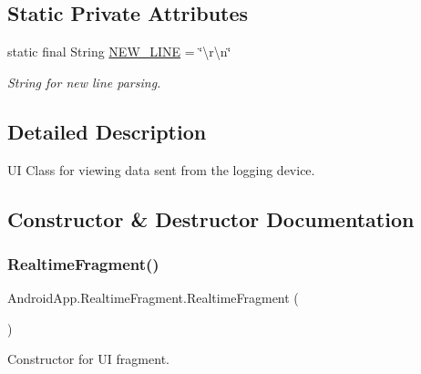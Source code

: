 \subsection*{Static Private Attributes}
\begin{DoxyCompactItemize}
\item 
\mbox{\label{class_android_app_1_1_realtime_fragment_a353558a83a489be25f413e3ea2451728}} 
static final String \hyperlink{class_android_app_1_1_realtime_fragment_a353558a83a489be25f413e3ea2451728}{N\+E\+W\+\_\+\+L\+I\+NE} = \char`\"{}\textbackslash{}r\textbackslash{}n\char`\"{}
\begin{DoxyCompactList}\small\item\em String for new line parsing. \end{DoxyCompactList}\end{DoxyCompactItemize}


\subsection{Detailed Description}
UI Class for viewing data sent from the logging device. 

\subsection{Constructor \& Destructor Documentation}
\mbox{\label{class_android_app_1_1_realtime_fragment_a834ef524bedd8948892a6915945c071c}} 
\subsubsection{\texorpdfstring{Realtime\+Fragment()}{RealtimeFragment()}}
{\footnotesize\ttfamily Android\+App.\+Realtime\+Fragment.\+Realtime\+Fragment (\begin{DoxyParamCaption}{ }\end{DoxyParamCaption})\hspace{0.3cm}{\ttfamily [inline]}}



Constructor for UI fragment. 

